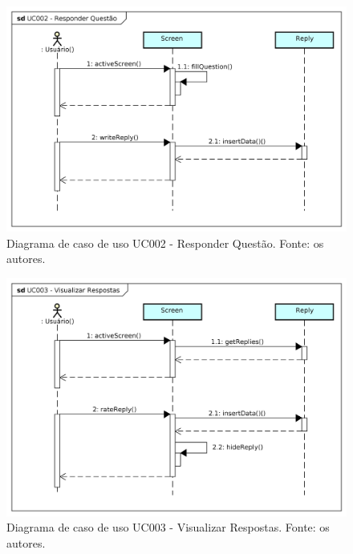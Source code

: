 \begin{figure}[!htb]
\centering
\includegraphics[width=16cm]{UC002-ResponderQuestao.png}
\caption{Diagrama de caso de uso UC002 - Responder Questão. Fonte: os autores.}
\label{fig:UC002}
\end{figure}

\begin{figure}[!htb]
\centering
\includegraphics[width=16cm]{UC003-VisualizarRespostas.png}
\caption{Diagrama de caso de uso UC003 - Visualizar Respostas. Fonte: os autores.}
\label{fig:UC003}
\end{figure}


